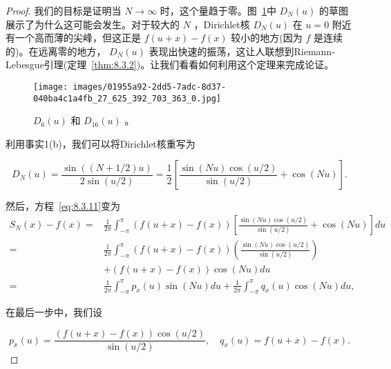 \begin{proof}
我们的目标是证明当 \(N \rightarrow  \infty\) 时，这个量趋于零。图~\ref{fig:8.4}中 \({D}_{N}\left( u\right)\) 的草图展示了为什么这可能会发生。对于较大的 \(N\) ，Dirichlet核 \({D}_{N}\left( u\right)\) 在 \(u = 0\) 附近有一个高而薄的尖峰，但这正是 \(f\left( {u + x}\right)  - f\left( x\right)\) 较小的地方(因为 \(f\) 是连续的)。在远离零的地方， \({D}_{N}\left( u\right)\) 表现出快速的振荡，这让人联想到Riemann-Lebesgue引理(定理~\ref{thm:8.3.2})。让我们看看如何利用这个定理来完成论证。


\begin{figure}[htbp]
  \centering
  \texttt{[image: images/01955a92-2dd5-7adc-8d37-040ba4c1a4fb\_27\_625\_392\_703\_363\_0.jpg]}
  \caption{\({D}_{6}\left( u\right)\) 和 \({D}_{16}\left( u\right)\) 。}
  \label{fig:8.4}
\end{figure}

利用事实1(b)，我们可以将Dirichlet核重写为

\[
{D}_{N}\left( u\right)  = \frac{\sin \left( {\left( {N + 1/2}\right) u}\right) }{2\sin \left( {u/2}\right) } = \frac{1}{2}\left\lbrack  {\frac{\sin \left( {Nu}\right) \cos \left( {u/2}\right) }{\sin \left( {u/2}\right) } + \cos \left( {Nu}\right) }\right\rbrack  .
\]

然后，方程~\eqref{eq:8.3.11}变为
\begin{align*}
{S}_{N}\left( x\right)  - f\left( x\right)  = & \frac{1}{2\pi }{\int }_{-\pi }^{\pi }\left( {f\left( {u + x}\right)  - f\left( x\right) }\right) \left\lbrack  {\frac{\sin \left( {Nu}\right) \cos \left( {u/2}\right) }{\sin \left( {u/2}\right) } + \cos \left( {Nu}\right) }\right\rbrack  {du}\\
= & \frac{1}{2\pi }{\int }_{-\pi }^{\pi }\left( {f\left( {u + x}\right)  - f\left( x\right) }\right) \left( \frac{\sin \left( {Nu}\right) \cos \left( {u/2}\right) }{\sin \left( {u/2}\right) }\right)\\
& + \left( {f\left( {u + x}\right)  - f\left( x\right) }\right) \cos \left( {Nu}\right) {du}\\
= & \frac{1}{2\pi }{\int }_{-\pi }^{\pi }{p}_{x}\left( u\right) \sin \left( {Nu}\right) {du} + \frac{1}{2\pi }{\int }_{-\pi }^{\pi }{q}_{x}\left( u\right) \cos \left( {Nu}\right) {du},
\end{align*}

在最后一步中，我们设

\[
{p}_{x}\left( u\right)  = \frac{\left( {f\left( {u + x}\right)  - f\left( x\right) }\right) \cos \left( {u/2}\right) }{\sin \left( {u/2}\right) }, \quad{q}_{x}\left( u\right)  = f\left( {u + x}\right)  - f\left( x\right) .
\]


\end{proof}
